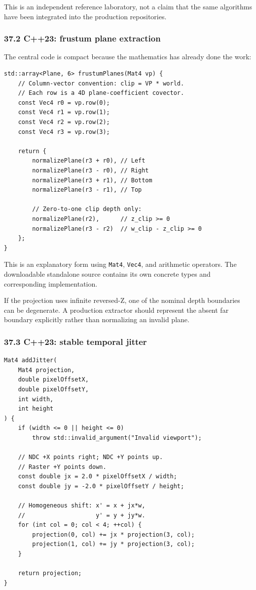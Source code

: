 This is an independent reference laboratory, not a claim that the same algorithms have been integrated into the production repositories.

\subsubsection{37.2 C++23: frustum plane extraction}\label{c23-frustum-plane-extraction}

The central code is compact because the mathematics has already done the work:

\begin{verbatim}
std::array<Plane, 6> frustumPlanes(Mat4 vp) {
    // Column-vector convention: clip = VP * world.
    // Each row is a 4D plane-coefficient covector.
    const Vec4 r0 = vp.row(0);
    const Vec4 r1 = vp.row(1);
    const Vec4 r2 = vp.row(2);
    const Vec4 r3 = vp.row(3);

    return {
        normalizePlane(r3 + r0), // Left
        normalizePlane(r3 - r0), // Right
        normalizePlane(r3 + r1), // Bottom
        normalizePlane(r3 - r1), // Top

        // Zero-to-one clip depth only:
        normalizePlane(r2),      // z_clip >= 0
        normalizePlane(r3 - r2)  // w_clip - z_clip >= 0
    };
}
\end{verbatim}

This is an explanatory form using \texttt{Mat4}, \texttt{Vec4}, and arithmetic operators. The downloadable standalone source contains its own concrete types and corresponding implementation.

If the projection uses infinite reversed-Z, one of the nominal depth boundaries can be degenerate. A production extractor should represent the absent far boundary explicitly rather than normalizing an invalid plane.

\subsubsection{37.3 C++23: stable temporal jitter}\label{c23-stable-temporal-jitter}

\begin{verbatim}
Mat4 addJitter(
    Mat4 projection,
    double pixelOffsetX,
    double pixelOffsetY,
    int width,
    int height
) {
    if (width <= 0 || height <= 0)
        throw std::invalid_argument("Invalid viewport");

    // NDC +X points right; NDC +Y points up.
    // Raster +Y points down.
    const double jx = 2.0 * pixelOffsetX / width;
    const double jy = -2.0 * pixelOffsetY / height;

    // Homogeneous shift: x' = x + jx*w,
    //                    y' = y + jy*w.
    for (int col = 0; col < 4; ++col) {
        projection(0, col) += jx * projection(3, col);
        projection(1, col) += jy * projection(3, col);
    }

    return projection;
}
\end{verbatim}

